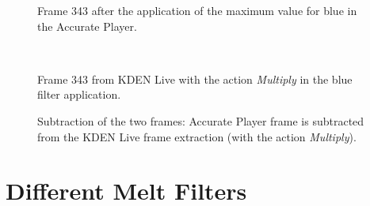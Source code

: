 \documentclass[../MasterThesis.tex]{subfiles}
\begin{document}
\begin{minipage}{0.48\textwidth}
	\begin{figure}[H]
		\begin{center}
			\caption[Frame 343 after the application of the blue filter in the Accurate Player.]{Frame 343 after the application of the maximum value for blue in the Accurate Player.}
		\end{center}
	\end{figure}
\end{minipage}\begin{minipage}{0.04\textwidth}
	\ 
\end{minipage}\begin{minipage}{0.48\textwidth}
	\begin{figure}[H]
		\begin{center}
			\caption[Frame 343 from KDEN Live with the action \textit{Multiply}.]{Frame 343 from KDEN Live with the action \textit{Multiply} in the blue filter application.}
		\end{center}
	\end{figure}
\end{minipage}

\vspace*{-1em}

\begin{figure}[H]
	\begin{center}
		\caption[Subtraction of KDEN Live (\textit{Multiply} and Accurate Player).]{Subtraction of the two frames: Accurate Player frame is subtracted from the KDEN Live frame extraction (with the action \textit{Multiply}).}
	\end{center}
\end{figure}









\newpage
\section{Different Melt Filters} \label{appendix:differentMeltFilter}
\end{document}
